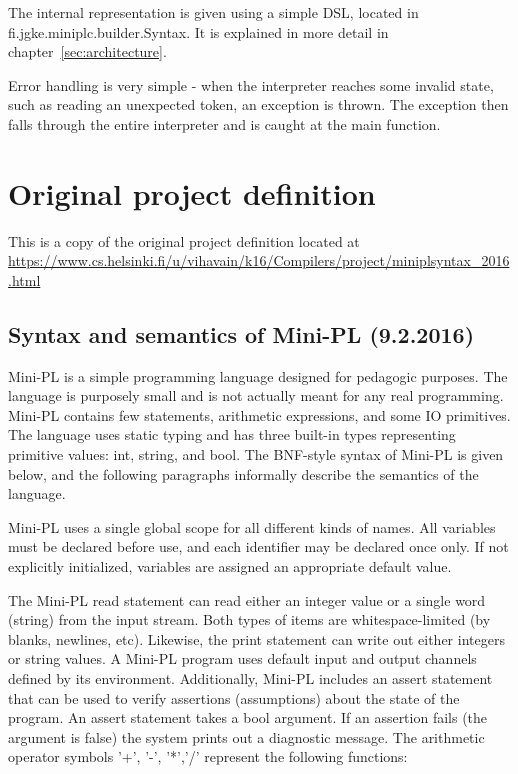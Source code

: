 \documentclass{article}
\begin{document}
The internal representation is given using a simple DSL, located in
fi.jgke.miniplc.builder.Syntax. It is explained in more detail in
chapter~\ref{sec:architecture}.

Error handling is very simple - when the interpreter reaches some invalid
state, such as reading an unexpected token, an exception is thrown. The
exception then falls through the entire interpreter and is caught at the main
function.

\newpage
\section{Original project definition}

This is a copy of the original project definition located at
\url{https://www.cs.helsinki.fi/u/vihavain/k16/Compilers/project/miniplsyntax\_2016.html}

\subsection{Syntax and semantics of Mini-PL (9.2.2016)}
Mini-PL is a simple programming language designed for pedagogic purposes. The
language is purposely small and is not actually meant for any real programming.
Mini-PL contains few statements, arithmetic expressions, and some IO
primitives. The language uses static typing and has three built-in types
representing primitive values: int, string, and bool. The BNF-style syntax of
Mini-PL is given below, and the following paragraphs informally describe the
semantics of the language.

Mini-PL uses a single global scope for all different kinds of names. All
variables must be declared before use, and each identifier may be declared once
only. If not explicitly initialized, variables are assigned an appropriate
default value.

The Mini-PL read statement can read either an integer value or a single word
(string) from the input stream. Both types of items are whitespace-limited (by
blanks, newlines, etc). Likewise, the print statement can write out either
integers or string values. A Mini-PL program uses default input and output
channels defined by its environment. Additionally, Mini-PL includes an assert
statement that can be used to verify assertions (assumptions) about the state
of the program. An assert statement takes a bool argument. If an assertion
fails (the argument is false) the system prints out a diagnostic message.  The
arithmetic operator symbols '+', '-', '*','/' represent the following
functions:
\end{document}
